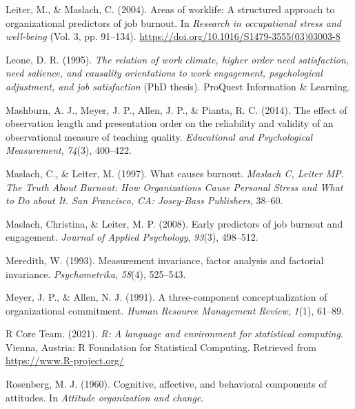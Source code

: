 \documentclass[
  man]{apa6}
\newlength{\cslhangindent}
\newlength{\cslentryspacingunit} %
\newenvironment{CSLReferences}[2] %
 {%
  \setlength{\parindent}{0pt}
  \ifodd #1
  \let\oldpar\par
  \def\par{\hangindent=\cslhangindent\oldpar}
  \fi
  \setlength{\parskip}{#2\cslentryspacingunit}
 }%
 {}
\begin{document}
\begin{CSLReferences}{1}{0}
\leavevmode{}%
Leiter, M., \& Maslach, C. (2004). Areas of worklife: A structured approach to organizational predictors of job burnout. In \emph{Research in occupational stress and well-being} (Vol. 3, pp. 91--134). \url{https://doi.org/10.1016/S1479-3555(03)03003-8}

\leavevmode{}%
Leone, D. R. (1995). \emph{The relation of work climate, higher order need satisfaction, need salience, and causality orientations to work engagement, psychological adjustment, and job satisfaction} (PhD thesis). ProQuest Information \& Learning.

\leavevmode{}%
Mashburn, A. J., Meyer, J. P., Allen, J. P., \& Pianta, R. C. (2014). The effect of observation length and presentation order on the reliability and validity of an observational measure of teaching quality. \emph{Educational and Psychological Measurement}, \emph{74}(3), 400--422.

\leavevmode{}%
Maslach, C., \& Leiter, M. (1997). What causes burnout. \emph{Maslach C, Leiter MP. The Truth About Burnout: How Organizations Cause Personal Stress and What to Do about It. San Francisco, CA: Josey-Bass Publishers}, 38--60.

\leavevmode{}%
Maslach, Christina, \& Leiter, M. P. (2008). Early predictors of job burnout and engagement. \emph{Journal of Applied Psychology}, \emph{93}(3), 498--512.

\leavevmode{}%
Meredith, W. (1993). Measurement invariance, factor analysis and factorial invariance. \emph{Psychometrika}, \emph{58}(4), 525--543.

\leavevmode{}%
Meyer, J. P., \& Allen, N. J. (1991). A three-component conceptualization of organizational commitment. \emph{Human Resource Management Review}, \emph{1}(1), 61--89.

\leavevmode{}%
R Core Team. (2021). \emph{R: A language and environment for statistical computing}. Vienna, Austria: R Foundation for Statistical Computing. Retrieved from \url{https://www.R-project.org/}

\leavevmode{}%
Rosenberg, M. J. (1960). Cognitive, affective, and behavioral components of attitudes. In \emph{Attitude organization and change}.


\end{CSLReferences}
\end{document}
